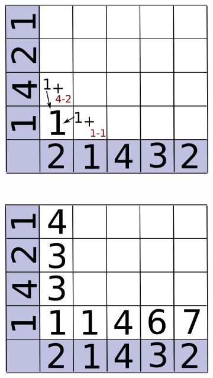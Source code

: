 \documentclass[parskip]{cs4rep}
\begin{document}
\begin{figure}
   \centering
   \begin{subfigure}[b]{0.3\textwidth}
       \includegraphics[width=\textwidth]{figures/DTW/worked-out/step-1.png}
       \caption{}
       \label{fig:DTW:example:1}
   \end{subfigure}
   ~
   \begin{subfigure}[b]{0.3\textwidth}
       \includegraphics[width=\textwidth]{figures/DTW/worked-out/step-2.png}
       \caption{}
       \label{fig:DTW:example:2}
   \end{subfigure}

\end{figure}
\end{document}
